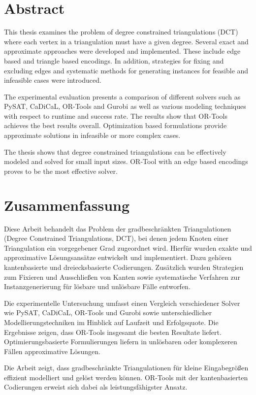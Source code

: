 \section*{Abstract}
This thesis examines the problem of degree constrained triangulations (DCT) where each vertex in a triangulation must have a given degree. 
Several exact and approximate approaches were developed and implemented. 
These include edge based and triangle based encodings. 
In addition, strategies for fixing and excluding edges and systematic methods for generating instances for feasible and infeasible cases were introduced.

The experimental evaluation presents a comparison of different solvers such as PySAT, CaDiCaL, OR-Tools and Gurobi as well as various modeling techniques with respect to runtime and success rate. 
The results show that OR-Tools achieves the best results overall. 
Optimization based formulations provide approximate solutions in infeasible or more complex cases.

The thesis shows that degree constrained triangulations can be effectively modeled and solved for small input sizes.
OR-Tool with an edge based encodings proves to be the most effective solver. 

\section*{Zusammenfassung}
Diese Arbeit behandelt das Problem der gradbeschränkten Triangulationen (Degree Constrained Triangulations, DCT), bei denen jedem Knoten einer Triangulation ein vorgegebener Grad zugeordnet wird. 
Hierfür wurden exakte und approximative Lösungsansätze entwickelt und implementiert.
Dazu gehören kantenbasierte und dreiecksbasierte Codierungen. 
Zusätzlich wurden Strategien zum Fixieren und Ausschließen von Kanten sowie systematische Verfahren zur Instanzgenerierung für lösbare und unlösbare Fälle entworfen.

Die experimentelle Untersuchung umfasst einen Vergleich verschiedener Solver wie PySAT, CaDiCaL, OR-Tools und Gurobi sowie unterschiedlicher Modellierungstechniken im Hinblick auf Laufzeit und Erfolgsquote. 
Die Ergebnisse zeigen, dass OR-Tools insgesamt die besten Resultate liefert. 
Optimierungsbasierte Formulierungen liefern in unlösbaren oder komplexeren Fällen approximative Lösungen.

Die Arbeit zeigt, dass gradbeschränkte Triangulationen für kleine Eingabegrößen effizient modelliert und gelöst werden können. 
OR-Tools mit der kantenbasierten Codierungen erweist sich dabei als leistungsfähigster Ansatz. 